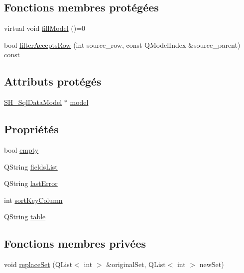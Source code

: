\subsection*{Fonctions membres protégées}
\begin{DoxyCompactItemize}
\item 
virtual void \hyperlink{classSH__ExtendedProxyModel_aff5c328203f14725f6f13e33a9f245ee}{fill\-Model} ()=0
\item 
bool \hyperlink{classSH__ExtendedProxyModel_a5c9a68f10afb83af24896beac56e0ae3}{filter\-Accepts\-Row} (int source\-\_\-row, const Q\-Model\-Index \&source\-\_\-parent) const 
\end{DoxyCompactItemize}
\subsection*{Attributs protégés}
\begin{DoxyCompactItemize}
\item 
\hyperlink{classSH__SqlDataModel}{S\-H\-\_\-\-Sql\-Data\-Model} $\ast$ \hyperlink{classSH__ExtendedProxyModel_a8c8b8930c6b1abd9bbb1dce1fdc9690b}{model}
\end{DoxyCompactItemize}
\subsection*{Propriétés}
\begin{DoxyCompactItemize}
\item 
bool \hyperlink{classSH__ExtendedProxyModel_a9e22d17af7776aca8052084cc33c3442}{empty}
\item 
Q\-String \hyperlink{classSH__ExtendedProxyModel_a15e779ba92384a57442d6bd79ef3d1d1}{fields\-List}
\item 
Q\-String \hyperlink{classSH__ExtendedProxyModel_a1597853dfae8c3972ef3396293d5d0fc}{last\-Error}
\item 
int \hyperlink{classSH__ExtendedProxyModel_a47e2d0b99b84fb066438db667dd1ad26}{sort\-Key\-Column}
\item 
Q\-String \hyperlink{classSH__ExtendedProxyModel_a7eef4557a77444e9ce5c24c180392bfa}{table}
\end{DoxyCompactItemize}
\subsection*{Fonctions membres privées}
\begin{DoxyCompactItemize}
\item 
void \hyperlink{classSH__ExtendedProxyModel_a83a4b566cb35e030a501e1ec2b346455}{replace\-Set} (Q\-List$<$ int $>$ \&original\-Set, Q\-List$<$ int $>$ new\-Set)
\end{DoxyCompactItemize}
